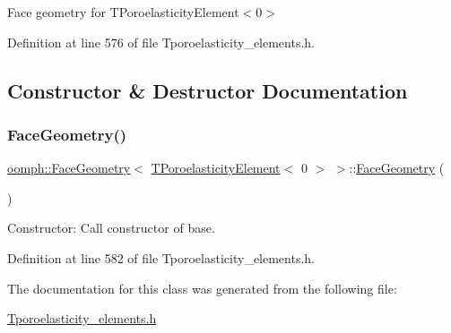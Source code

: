 Face geometry for T\+Poroelasticity\+Element$<$0$>$ 

Definition at line 576 of file Tporoelasticity\+\_\+elements.\+h.



\subsection{Constructor \& Destructor Documentation}
\mbox{\label{classoomph_1_1FaceGeometry_3_01TPoroelasticityElement_3_010_01_4_01_4_a3a2d7743dbb5afc9235b79e61d1011a7}} 
\subsubsection{\texorpdfstring{Face\+Geometry()}{FaceGeometry()}}
{\footnotesize\ttfamily \hyperlink{classoomph_1_1FaceGeometry}{oomph\+::\+Face\+Geometry}$<$ \hyperlink{classoomph_1_1TPoroelasticityElement}{T\+Poroelasticity\+Element}$<$ 0 $>$ $>$\+::\hyperlink{classoomph_1_1FaceGeometry}{Face\+Geometry} (\begin{DoxyParamCaption}{ }\end{DoxyParamCaption})\hspace{0.3cm}{\ttfamily [inline]}}



Constructor\+: Call constructor of base. 



Definition at line 582 of file Tporoelasticity\+\_\+elements.\+h.



The documentation for this class was generated from the following file\+:\begin{DoxyCompactItemize}
\item 
\hyperlink{Tporoelasticity__elements_8h}{Tporoelasticity\+\_\+elements.\+h}\end{DoxyCompactItemize}
